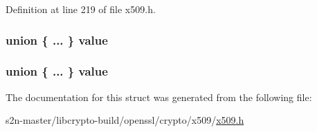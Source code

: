 Definition at line 219 of file x509.\+h.

\subsubsection[{\texorpdfstring{value}{value}}]{\setlength{\rightskip}{0pt plus 5cm}union \{ ... \}   value}\hypertarget{structx509__attributes__st_a832e7da9e8ee60de1ec9d51e8167494a}{}\label{structx509__attributes__st_a832e7da9e8ee60de1ec9d51e8167494a}
\subsubsection[{\texorpdfstring{value}{value}}]{\setlength{\rightskip}{0pt plus 5cm}union \{ ... \}   value}\hypertarget{structx509__attributes__st_abb5eb07460df18cef81d7f6314308536}{}\label{structx509__attributes__st_abb5eb07460df18cef81d7f6314308536}


The documentation for this struct was generated from the following file\+:\begin{DoxyCompactItemize}
\item 
s2n-\/master/libcrypto-\/build/openssl/crypto/x509/\hyperlink{crypto_2x509_2x509_8h}{x509.\+h}\end{DoxyCompactItemize}
